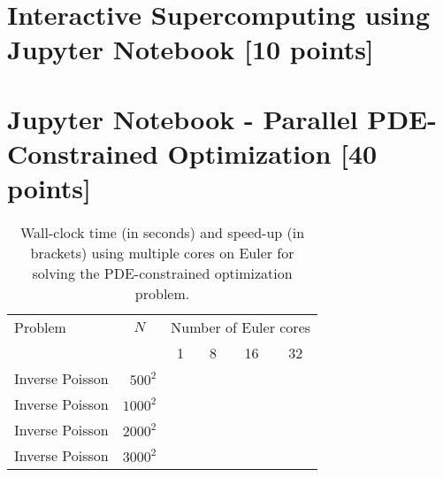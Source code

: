 \documentclass[unicode,11pt,a4paper,oneside,numbers=endperiod,openany]{scrartcl}
\begin{document}

\section{Interactive Supercomputing using Jupyter Notebook  [10 points]}




\section{Jupyter Notebook - Parallel PDE-Constrained Optimization [40 points]}

\begin{table}[h]
  \caption{Wall-clock time (in seconds) and speed-up (in brackets) using multiple cores on Euler for solving the PDE-constrained optimization problem.}
	\centering
	
	\medskip
	
	\begin{tabular}{l|r||r|r|r|r}\hline\hline
		Problem & \multicolumn{1}{c||}{$N$} &  \multicolumn{4}{c}{Number of Euler cores} \\
		&       & \multicolumn{1}{c|}{1} & \multicolumn{1}{c|}{8} & \multicolumn{1}{c|}{16} & \multicolumn{1}{c}{32} \\
		\hline\hline
		{ Inverse Poisson} & $500^2$  &    \phantom{222222}        &    \phantom{222222}      & \phantom{222222}         &      \phantom{222222} \\
		{ Inverse  Poisson} & $1000^2$ &            &          &          &       \\
		{ Inverse Poisson} & $2000^2$ &            &          &          &       \\
		{ Inverse Poisson} & $3000^2$ &            &          &          &       \\\hline \hline
	\end{tabular}
	
	\label{tab:PDEparallel}
\end{table}
\end{document}

